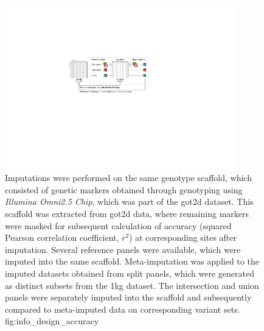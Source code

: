 

\begin{figure}[!htb]
\centering
\includegraphics[width=0.9\textwidth]{./img/ch2/info_design_accuracy}
{Imputations were performed on the same genotype scaffold, which consisted of genetic markers obtained through genotyping using \emph{Illumina Omni2.5 Chip}, which was part of the \gls{got2d} dataset.
This scaffold was extracted from \gls{got2d} data, where remaining markers were masked for subsequent calculation of accuracy (squared Pearson correlation coefficient, $r^2$) at corresponding sites after imputation.
Several reference panels were available, which were imputed into the same scaffold.
Meta-imputation was applied to the imputed datasets obtained from split panels, which were generated as distinct subsets from the \gls{1kg} dataset.
The intersection and union panels were separately imputed into the scaffold and subsequently compared to meta-imputed data on corresponding variant sets.}
{fig:info_design_accuracy}
\end{figure}
